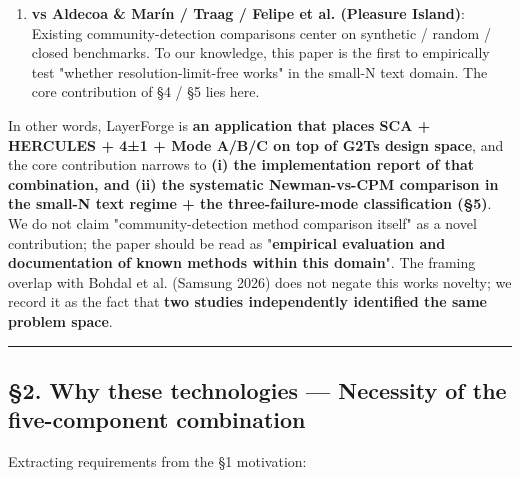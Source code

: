 \documentclass[
]{article}
\begin{document}
\begin{enumerate}
  the opposite direction from the LLM-integrated family. With Core-based
  GraphRAG we share the recognition of "Leiden\textquotesingle s
  reproducibility problem", but we diverge by going for
  \textbf{failure-mode documentation + method-selection signal inside
  the modularity family} rather than replacement (k-core).
\item
  \textbf{vs Aldecoa \& Marín / Traag / Felipe et al. (Pleasure
  Island)}: Existing community-detection comparisons center on synthetic
  / random / closed benchmarks. To our knowledge, this paper is the
  first to empirically test "whether resolution-limit-free works" in the
  small-N text domain. The core contribution of §4 / §5 lies here.
\end{enumerate}

In other words, LayerForge is \textbf{an application that places SCA +
HERCULES + 4±1 + Mode A/B/C on top of G2T\textquotesingle s design
space}, and the core contribution narrows to \textbf{(i) the
implementation report of that combination, and (ii) the systematic
Newman-vs-CPM comparison in the small-N text regime + the
three-failure-mode classification (§5)}. We do not claim
"community-detection method comparison itself" as a novel contribution;
the paper should be read as "\textbf{empirical evaluation and
documentation of known methods within this domain}". The framing overlap
with Bohdal et al. (Samsung 2026) does not negate this
work\textquotesingle s novelty; we record it as the fact that
\textbf{two studies independently identified the same problem space}.

\begin{center}\rule{0.5\linewidth}{0.5pt}\end{center}

\subsection{§2. Why these technologies --- Necessity of the
five-component
combination}\label{2-why-these-technologies--necessity-of-the-five-component-combination}

Extracting requirements from the §1 motivation:
\end{document}
